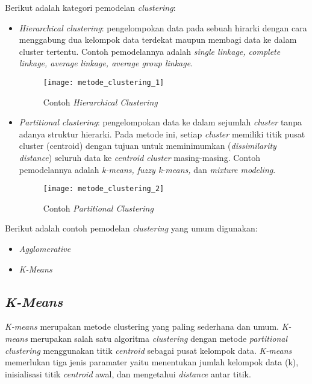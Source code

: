 \noindent Berikut adalah kategori pemodelan {\it clustering}:
\begin{itemize}
\item \textit{Hierarchical clustering}: pengelompokan data pada sebuah hirarki dengan cara menggabung dua kelompok data terdekat maupun membagi data ke dalam cluster tertentu. Contoh pemodelannya adalah {\it single linkage, complete linkage, average linkage, average group linkage}.

\begin{figure}[H]
	\centering
	\texttt{[image: metode\_clustering\_1]}
	\caption{Contoh {\it Hierarchical Clustering}}
	\label{fig:metode_clustering_1}
\end{figure} 

\item \textit{Partitional clustering}: pengelompokan data ke dalam sejumlah \textit{cluster} tanpa adanya struktur hierarki. Pada metode ini, setiap \textit{cluster} memiliki titik pusat cluster (centroid) dengan tujuan untuk meminimumkan ({\it dissimilarity distance}) seluruh data ke {\it centroid cluster} masing-masing. Contoh pemodelannya adalah {\it k-means, fuzzy k-means,} dan {\it mixture modeling}.

\begin{figure}[H]
	\centering
	\texttt{[image: metode\_clustering\_2]}
	\caption{Contoh {\it Partitional Clustering}}
	\label{fig:metode_clustering_2}
\end{figure}

\end{itemize}

\noindent Berikut adalah contoh pemodelan {\it clustering} yang umum digunakan:
\begin{itemize}
\item {\it Agglomerative}
\item {\it K-Means}
\end{itemize}

\subsection{\textit{K-Means}} 
\label{sec:k_means}
\textit {K-means} merupakan metode clustering yang paling sederhana dan umum. {\it K-means} merupakan salah satu algoritma {\it clustering} dengan metode {\it partitional clustering} menggunakan titik {\it centroid} sebagai pusat kelompok data. {\it K-means} memerlukan tiga jenis paramater yaitu menentukan jumlah kelompok data (k),  inisialisasi titik {\it centroid} awal, dan mengetahui {\it distance} antar titik. \\


